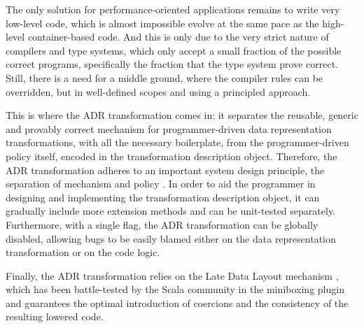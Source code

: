The only solution for performance-oriented applications remains to write very low-level code, which is almost impossible evolve at the same pace as the high-level container-based code. And this is only due to the very strict nature of compilers and type systems, which only accept a small fraction of the possible correct programs, specifically the fraction that the type system prove correct. Still, there is a need for a middle ground, where the compiler rules can be overridden, but in well-defined scopes and using a principled approach. %

This is where the ADR transformation comes in: it separates the reusable, generic and provably correct mechanism for programmer-driven data representation transformations, with all the necessary boilerplate, from the programmer-driven policy itself, encoded in the transformation description object. Therefore, the ADR transformation adheres to an important system design principle, the separation of mechanism and policy \cite{lampson-mechanism-policy}. In order to aid the programmer in designing and implementing the transformation description object, it can gradually include more extension methods and can be unit-tested separately. Furthermore, with a single flag, the ADR transformation can be globally disabled, allowing bugs to be easily blamed either on the data representation transformation or on the code logic.

Finally, the ADR transformation relies on the Late Data Layout mechanism \cite{ldl,ldl-www}, which has been battle-tested by the Scala community in the miniboxing plugin \cite{miniboxing,miniboxing-www} and guarantees the optimal introduction of coercions and the consistency of the resulting lowered code.


